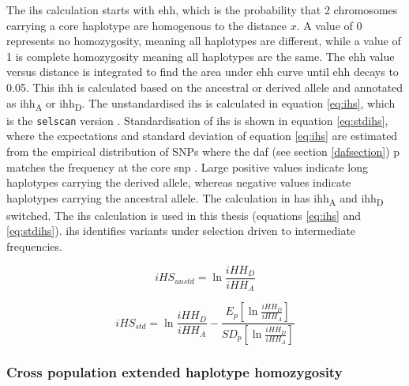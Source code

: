 \documentclass[twoside,openright]{report}
\begin{document}
The \gls{ihs} \citep{voight2006map, Szpiech2014} calculation starts with
\gls{ehh}, which is the probability that 2 chromosomes carrying a core
haplotype are homogenous to the distance \(x\). A value of 0 represents
no homozygosity, meaning all haplotypes are different, while a value of
1 is complete homozygosity meaning all haplotypes are the same. The
\gls{ehh} value versus distance is integrated to find the area under
\gls{ehh} curve until \gls{ehh} decays to 0.05. This \gls{ihh} is
calculated based on the ancestral or derived allele and annotated as
\gls{ihh}\textsubscript{A} or \gls{ihh}\textsubscript{D}. The
unstandardised \gls{ihs} is calculated in equation \eqref{eq:ihs}, which
is the \texttt{selscan} version \citep{Szpiech2014}. Standardisation of
\gls{ihs} is shown in equation \eqref{eq:stdihs}, where the expectations
and standard deviation of equation \eqref{eq:ihs} are estimated from the
empirical distribution of SNPs where the \gls{daf} (see section
\ref{dafsection}) p matches the frequency at the core \gls{snp}
\citep{voight2006map}. Large positive values indicate long haplotypes
carrying the derived allele, whereas negative values indicate haplotypes
carrying the ancestral allele. The calculation in \citet{voight2006map}
has \gls{ihh}\textsubscript{A} and \gls{ihh}\textsubscript{D} switched.
The \citet{Szpiech2014} \gls{ihs} calculation is used in this thesis
(equations \eqref{eq:ihs} and \eqref{eq:stdihs}). \Gls{ihs} identifies
variants under selection driven to intermediate frequencies.

\begin{equation} 
iHS_{unstd} = \ln{\frac{iHH_D}{iHH_A}}
\label{eq:ihs}
\end{equation}

\begin{equation} 
iHS_{std} = \ln{\frac{iHH_D}{iHH_A}} - \frac{E_p [\ln{\frac{iHH_D}{iHH_A}}] }{ SD_p [\ln{\frac{iHH_D}{iHH_A}}] }
\label{eq:stdihs}
\end{equation}

\subsubsection{Cross population extended haplotype
homozygosity}\label{cross-population-extended-haplotype-homozygosity}
\end{document}
